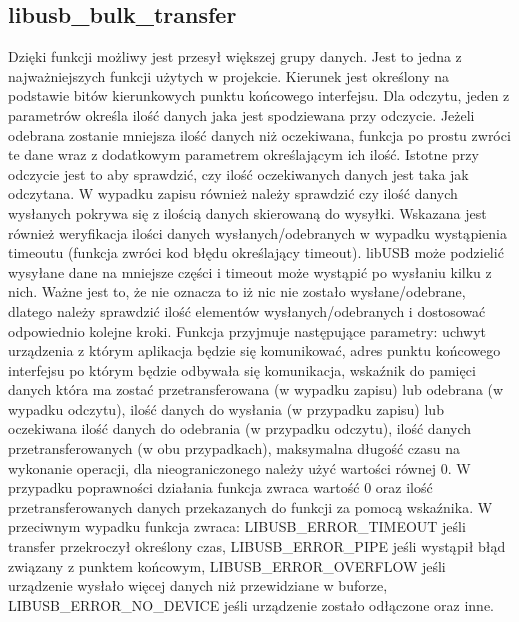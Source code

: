 \documentclass{BscUS}
\begin{document}
\subsection{libusb\_bulk\_transfer}
\noindent Dzięki funkcji możliwy jest przesył większej grupy danych. Jest to jedna z najważniejszych funkcji użytych w projekcie.
Kierunek jest określony na podstawie bitów kierunkowych punktu końcowego interfejsu.
Dla odczytu, jeden z parametrów określa ilość danych jaka jest spodziewana przy odczycie. Jeżeli odebrana zostanie mniejsza ilość danych niż oczekiwana, funkcja po prostu zwróci te dane wraz z dodatkowym parametrem określającym ich ilość. Istotne przy odczycie jest to aby sprawdzić, czy ilość oczekiwanych danych jest taka jak odczytana.
W wypadku zapisu również należy sprawdzić czy ilość danych wysłanych pokrywa się z ilością danych skierowaną do wysyłki.
Wskazana jest również weryfikacja ilości danych wysłanych/odebranych w wypadku wystąpienia timeoutu (funkcja zwróci kod błędu określający timeout). libUSB może podzielić wysyłane dane na mniejsze części i timeout może wystąpić po wysłaniu kilku z nich. Ważne jest to, że nie oznacza to iż nic nie zostało wysłane/odebrane, dlatego należy sprawdzić ilość elementów wysłanych/odebranych i dostosować odpowiednio kolejne kroki.
Funkcja przyjmuje następujące parametry: uchwyt urządzenia z którym aplikacja będzie się komunikować, adres punktu końcowego interfejsu po którym będzie odbywała się komunikacja, wskaźnik do pamięci danych która ma zostać przetransferowana (w wypadku zapisu) lub odebrana (w wypadku odczytu), ilość danych do wysłania (w przypadku zapisu) lub oczekiwana ilość danych do odebrania (w przypadku odczytu), ilość danych przetransferowanych (w obu przypadkach), maksymalna długość czasu na wykonanie operacji, dla nieograniczonego należy użyć wartości równej 0.
W przypadku poprawności działania funkcja zwraca wartość 0 oraz ilość przetransferowanych danych przekazanych do funkcji za pomocą wskaźnika.
W przeciwnym wypadku funkcja zwraca: LIBUSB\_ERROR\_TIMEOUT jeśli transfer przekroczył określony czas, LIBUSB\_ERROR\_PIPE jeśli wystąpił błąd związany z punktem końcowym, LIBUSB\_ERROR\_OVERFLOW jeśli urządzenie wysłało więcej danych niż przewidziane w buforze, LIBUSB\_ERROR\_NO\_DEVICE jeśli urządzenie zostało odłączone oraz inne.
\end{document}
